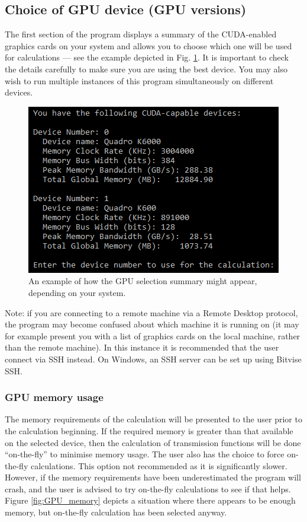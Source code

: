 \documentclass[12pt,a4paper]{article}
\begin{document}
\subsection{Choice of GPU device (GPU versions)}

The first section of the program displays a summary of the CUDA-enabled graphics cards on your system and allows you to choose which one will be used for calculations --- see the example depicted in Fig. \ref{fig:GPU}.
It is important to check the details carefully to make sure you are using the best device.
You may also wish to run multiple instances of this program simultaneously on different devices.

\begin{figure}[!h]
\begin{center}
\includegraphics[scale=0.75]{GPU.png}
\caption{An example of how the GPU selection summary might appear, depending on your system.}
\label{fig:GPU}
\end{center}
\end{figure}

Note: if you are connecting to a remote machine via a Remote Desktop protocol, the program may become confused about which machine it is running on (it may for example present you with a list of graphics cards on the local machine, rather than the remote machine).
In this instance it is recommended that the user connect via SSH instead.
On Windows, an SSH server can be set up using Bitvise SSH.

\subsubsection{GPU memory usage}

The memory requirements of the calculation will be presented to the user prior to the calculation beginning.
If the required memory is greater than that available on the selected device, then the calculation of transmission functions will be done ``on-the-fly'' to minimise memory usage.
The user also has the choice to force on-the-fly calculations.
This option not recommended as it is significantly slower.
However, if the memory requirements have been underestimated the program will crash, and the user is advised to try on-the-fly calculations to see if that helps.
Figure \ref{fig:GPU_memory} depicts a situation where there appears to be enough memory, but on-the-fly calculation has been selected anyway.
\end{document}
